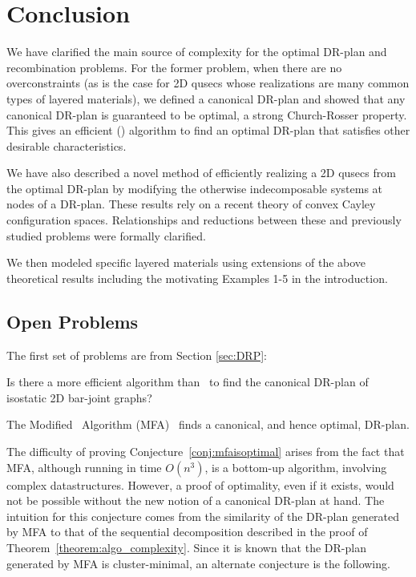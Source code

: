 \section{Conclusion}
\label{sec:conclusion}

We have clarified the main source of complexity for the optimal DR-plan and recombination problems. For the former problem, when there are no overconstraints (as is the case for 2D qusecs whose realizations are many common types of layered materials), we defined a canonical DR-plan and showed that any canonical DR-plan is guaranteed to be optimal, a strong Church-Rosser property. This gives an efficient (\ComplexityCanDRP) algorithm to find an optimal DR-plan that satisfies other desirable characteristics.

We have also described a novel method of efficiently realizing a 2D qusecs from the optimal DR-plan by modifying the otherwise indecomposable systems  at nodes of a DR-plan. These results rely on a recent theory of convex Cayley configuration spaces. Relationships and reductions between these and previously studied problems were formally clarified.

We then modeled specific layered materials using extensions of the above theoretical results including the motivating Examples 1-5 in the introduction.


\subsection{Open Problems}
\label{sec:appendix:b}
\label{sec:futurework}
\label{sec:open}

The first set of problems are from Section \ref{sec:DRP}:
\begin{openproblem}
    Is there a more efficient algorithm than \ComplexityCanDRPV\ to find the canonical DR-plan of isostatic 2D bar-joint graphs?
\end{openproblem}

\begin{conjecture}
\label{conj:mfaisoptimal}
    The Modified \frontier\ Algorithm (MFA)~\cite{lomonosov2004graph} finds a canonical, and hence optimal, DR-plan.
\end{conjecture}

The difficulty of proving Conjecture~\ref{conj:mfaisoptimal} arises from the fact that MFA, although running in time $O(n^3)$, is a bottom-up algorithm, involving complex datastructures. However, a proof of optimality, even if it exists, would not be possible without the new notion of a canonical DR-plan at hand. The intuition for this conjecture comes from the similarity of the DR-plan generated by MFA to that of the sequential decomposition described in the proof of Theorem~\ref{theorem:algo_complexity}.  Since it is known \cite{lomonosov2004graph} that the DR-plan generated by MFA is cluster-minimal, an alternate conjecture is the following.

